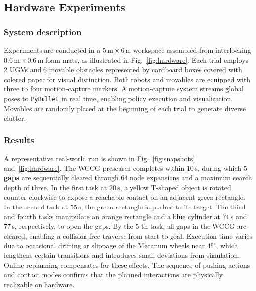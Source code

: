 \subsection{Hardware Experiments}\label{subsec:hardware}

\subsubsection{System description}\label{subsec:exp-description}
Experiments are conducted in a $5\,\mathrm{m}\times6\,\mathrm{m}$ workspace assembled from
interlocking $0.6\,\mathrm{m}\times0.6\,\mathrm{m}$ foam mats, as illustrated in
Fig.~\ref{fig:hardware}. Each trial employs $2$ UGVs and $6$ movable obstacles
represented by cardboard boxes covered with colored paper for visual distinction. Both robots and
movables are equipped with three to four motion-capture markers. A motion-capture system streams
global poses to \texttt{PyBullet} in real time, enabling policy execution and visualization.
Movables are randomly placed at the beginning of each trial to generate diverse clutter.

\subsubsection{Results}\label{subsec:exp-results}
A representative real-world run is shown in Fig.~\ref{fig:snapshots} and~\ref{fig:hardware}.
The WCCG presearch completes
within $10$\,s, during which \textbf{$5$ gaps} are sequentially cleared through $64$ node expansions and a
maximum search depth of three. In the first task at $20$\,s, a yellow T-shaped object is rotated
counter-clockwise to expose a reachable contact on an adjacent green rectangle. In the second task
at $55$\,s, the green rectangle is pushed to its target. The third and fourth tasks manipulate an
orange rectangle and a blue cylinder at $71$\,s and $77$\,s, respectively, to open the
gaps. By the $5$-th task, all gaps in the WCCG are cleared, enabling a collision-free traverse from
start to goal. Execution time varies due to occasional drifting or slippage of the Mecanum wheels
near $45^\circ$, which lengthens certain transitions and introduces small deviations from simulation.
Online replanning compensates for these effects. The sequence of pushing actions and contact modes
confirms that the planned interactions are physically realizable on hardware.



